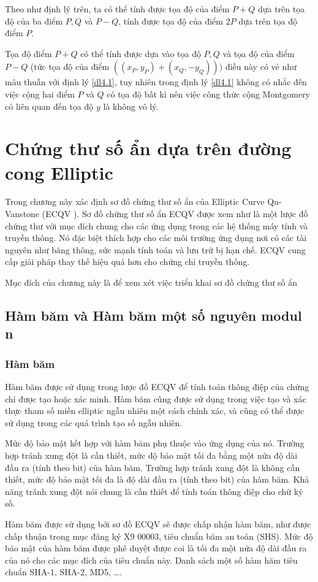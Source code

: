 \documentclass[a4paper,12pt]{report}
\begin{document}
Theo như định lý trên, ta có thể tính được tọa độ của điểm $P + Q$ dựa trên tọa độ của ba điểm $P, Q$ và $P-Q$, tính được tọa độ của điểm $2P$ dựa trên tọa độ điểm $P$.

Tọa độ điểm $P+Q$ có thể tính được dựa vào tọa độ $P, Q$ và tọa độ của điểm $P-Q$ (tức tọa độ của điểm $((x_P, y_P) + (x_Q, -y_Q)))$ điều này có vẻ như mâu thuẫn với định lý \ref{dl4.1}, tuy nhiên trong định lý \ref{dl4.1} không có nhắc đến việc cộng hai điểm $P$ và $Q$ có tọa độ bất kì nên việc công thức cộng Montgomery có liên quan đến tọa độ $y$ là không vô lý.
\chapter{Chứng thư số ẩn dựa trên đường cong Elliptic}
Trong chương này xác định sơ đồ chứng thư số ẩn của Elliptic Curve Qu-Vanstone (ECQV ). Sơ đồ chứng thư số ẩn ECQV được xem như là một lược đồ chứng thư với mục đích chung cho các ứng dụng trong các hệ thống máy tính và truyền thông. Nó đặc biệt thích hợp cho các môi trường ứng dụng nơi có các tài nguyên như băng thông, sức mạnh tính toán và lưu trữ bị hạn chế. ECQV cung cấp giải pháp thay thế hiệu quả hơn cho chứng chỉ truyền thống.

Mục đích của chương này là để xem xét việc triển khai sơ đồ chứng thư số ẩn 
\section{Hàm băm và Hàm băm một số nguyên modul n}
\subsection*{Hàm băm}
Hàm băm được sử dụng trong lược đồ ECQV để tính toán thông điệp của chứng chỉ được tạo hoặc xác minh. Hàm băm cũng được sử dụng trong việc tạo và xác thực tham số miền elliptic ngẫu nhiên một cách chính xác, và cũng có thể được sử dụng trong các quá trình tạo số ngẫu nhiên.

Mức độ bảo mật kết hợp với hàm băm phụ thuộc vào ứng dụng của nó. Trường hợp tránh xung đột là cần thiết, mức độ bảo mật tối đa bằng một nửa độ dài đầu ra (tính theo bit) của hàm băm. Trường hợp tránh xung đột là không cần thiết, mức độ bảo mật tối đa là độ dài đầu ra (tính theo bit) của hàm băm. Khả năng tránh xung đột nói chung là cần thiết để tính toán thông điệp cho chữ ký số.

Hàm băm được sử dụng bởi sơ đồ ECQV sẽ được chấp nhận hàm băm, như được chấp thuận trong mục đăng ký X9 00003, tiêu chuẩn băm an toàn (SHS). Mức độ bảo mật của hàm băm được phê duyệt được coi là tối đa một nửa độ dài đầu ra của nó cho các mục đích của tiêu chuẩn này. Danh sách một số hàm hăm tiêu chuẩn SHA-1, SHA-2, MD5, \ldots.
\end{document}
